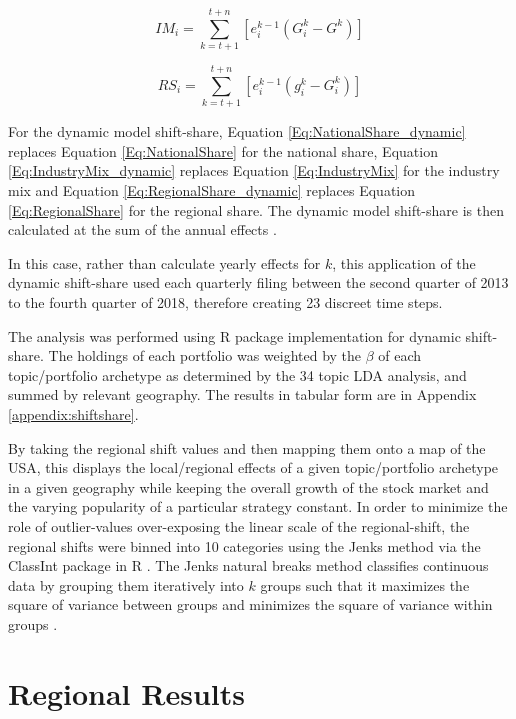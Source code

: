 \begin{equation}
    IM_{i} = \sum_{k=t+1}^{t+n}[e^{k-1}_i(G^{k}_{i}-G^{k})]
     \label{Eq:IndustryMix_dynamic}
\end{equation}

\begin{equation}
    RS_{i} = \sum_{k=t+1}^{t+n}[e^{k-1}_i(g^{k}_{i} - G^{k}_{i} )]
        \label{Eq:RegionalShare_dynamic}
\end{equation}

For the dynamic model shift-share, Equation \ref{Eq:NationalShare_dynamic} replaces Equation \ref{Eq:NationalShare} for the national share, Equation \ref{Eq:IndustryMix_dynamic} replaces Equation \ref{Eq:IndustryMix}  for the industry mix and Equation \ref{Eq:RegionalShare_dynamic} replaces Equation \ref{Eq:RegionalShare} for the regional share.  The dynamic model shift-share is then calculated at the sum of the annual effects \citep{BarffKnight88}.  

In this case, rather than calculate yearly effects for $k$, this application of the dynamic shift-share used each quarterly filing between the second quarter of 2013 to the fourth quarter of 2018, therefore creating 23 discreet time steps.

The analysis was performed using \cite{Soudis2019} R package implementation for dynamic shift-share. The holdings of each portfolio was weighted by the $\beta$ of each topic/portfolio archetype as determined by the 34 topic LDA analysis, and summed by relevant geography. The results in tabular form are in Appendix \ref{appendix:shiftshare}.

By taking the regional shift values and then mapping them onto a map of the USA, this displays the local/regional effects of a given topic/portfolio archetype in a given geography while keeping the overall growth of the stock market and the varying popularity of a particular strategy constant. In order to minimize the role of outlier-values over-exposing the linear scale of the regional-shift, the regional shifts were binned into 10 categories using the Jenks method via the ClassInt package in R \citep{classInt}.  The Jenks natural breaks method classifies continuous data by grouping them iteratively into $k$ groups such that it maximizes the square of variance between groups and minimizes the square of variance within groups \citep{jenks1967data}.  




\section{Regional Results}

